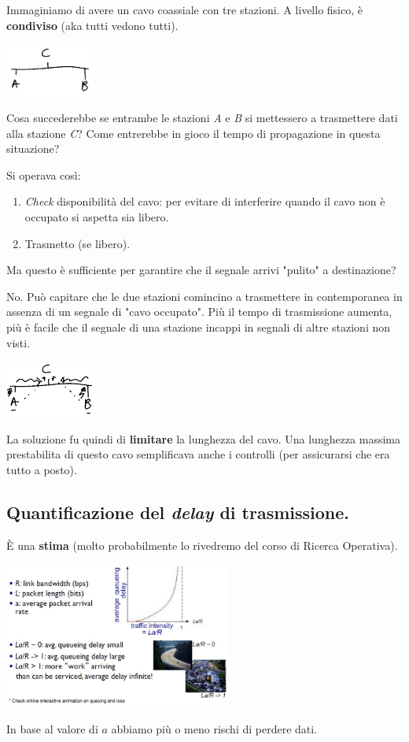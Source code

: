 \documentclass[10pt, a4paper, openany]{book}
\begin{document}
\noindent Immaginiamo di avere un cavo coassiale con tre stazioni. A livello fisico, è \textbf{condiviso} (aka tutti vedono tutti).
\begin{center}
    \includegraphics[width=30mm]{cap1 - Introduzione alle reti - 24.jpg}
\end{center}
\noindent Cosa succederebbe se entrambe le stazioni \textit{A} e \textit{B} si mettessero a trasmettere dati alla stazione \textit{C}? Come entrerebbe in gioco il tempo di propagazione in questa situazione?

\noindent Si operava così:
\begin{enumerate}
    \item \textit{Check} disponibilità del cavo: per evitare di interferire quando il cavo non è occupato si aspetta sia libero.
    \item Trasmetto (se libero).
\end{enumerate}
\noindent Ma questo è sufficiente per garantire che il segnale arrivi "pulito" a destinazione?

\noindent No. Può capitare che le due stazioni comincino a trasmettere in contemporanea in assenza di un segnale di "cavo occupato". Più il tempo di trasmissione aumenta, più è facile che il segnale di una stazione incappi in segnali di altre stazioni non visti.
\begin{center}
    \includegraphics[width=30mm]{cap1 - Introduzione alle reti - 25.jpg}
\end{center}
\noindent La soluzione fu quindi di \textbf{limitare} la lunghezza del cavo. Una lunghezza massima prestabilita di questo cavo semplificava anche i controlli (per assicurarsi che era tutto a posto).

\subsection{Quantificazione del \textit{delay} di trasmissione.}

\noindent È una \textbf{stima} (molto probabilmente lo rivedremo del corso di Ricerca Operativa).
\begin{center}
    \includegraphics[width=75mm]{cap1 - Introduzione alle reti - 26.jpg}
\end{center}
\noindent In base al valore di $a$ abbiamo più o meno rischi di perdere dati.
\end{document}

